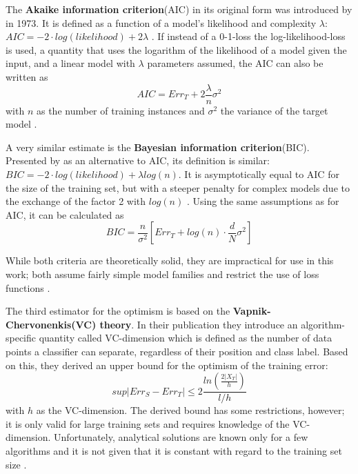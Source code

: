 The \textbf{Akaike information criterion}(AIC) in its original form was introduced by \cite{Akaike1998} in 1973. It is defined as a function of a model's likelihood and complexity $\lambda$: $AIC = -2 \cdot log(likelihood) + 2\lambda$ \cite{Bozdogan1987}. If instead of a 0-1-loss the log-likelihood-loss is used, a quantity that uses the logarithm of the likelihood of a model given the input, and a linear model with $\lambda$ parameters assumed, the AIC can also be written as
\begin{equation}
AIC = Err_T + 2\frac{\lambda}{n}\sigma^2
\end{equation}
with $n$ as the number of training instances and $\sigma^2$ the variance of the target model \cite{HastieEtAl2009}.

A very similar estimate is the \textbf{Bayesian information criterion}(BIC). Presented by \cite{Schwarz1978} as an alternative to AIC, its definition is similar: $BIC = -2 \cdot log(likelihood) + \lambda log(n)$. It is asymptotically equal to AIC for the size of the training set, but with a steeper penalty for complex models due to the exchange of the factor 2 with $log(n)$ \cite{Weakliem1999}. Using the same assumptions as for AIC, it can be calculated as
\begin{equation}
BIC = \frac{n}{\sigma^2}[Err_T + log(n) \cdot \frac{d}{N}\sigma^2]
\end{equation}

While both criteria are theoretically solid, they are impractical for use in this work; both assume fairly simple model families and restrict the use of loss functions \cite{HastieEtAl2009}.

The third estimator for the optimism is based on the \textbf{Vapnik-Chervonenkis(VC) theory}. In their publication \cite{Vapnik1982} they introduce an algorithm-specific quantity called VC-dimension which is defined as the number of data points a classifier can separate, regardless of their position and class label. Based on this, they derived an upper bound for the optimism of the training error:
\begin{equation}
sup|Err_S - Err_T| \leq 2\frac{ln(\frac{2|X_T|}{h})}{l / h}
\end{equation}
with $h$ as the VC-dimension. The derived bound has some restrictions, however; it is only valid for large training sets and requires knowledge of the VC-dimension. Unfortunately, analytical solutions are known only for a few algorithms and it is not given that it is constant with regard to the training set size \cite{BrumenEtal2004}.

